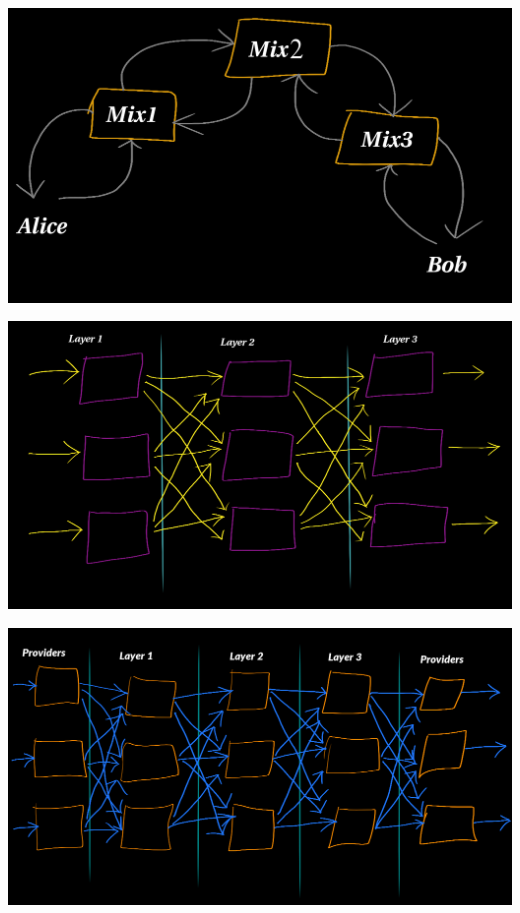 \documentclass[fleqn,xcolor={usenames,dvipsnames}]{beamer} %
\begin{document}
\begin{frame}
\begin{center}
\includegraphics[scale=.25]{pics/free_route3}
\end{center}
\end{frame}

\begin{frame}
\begin{center}
\includegraphics[scale=.24]{pics/stratified_topology1}
\end{center}
\end{frame}

\begin{frame}
\begin{center}
\includegraphics[scale=.25]{pics/stratified_topology2}
\end{center}
\end{frame}
\end{document}
